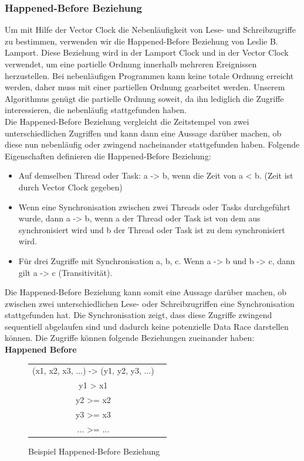 \documentclass[10pt,a4paper]{article}
\begin{document}
\subsubsection{Happened-Before Beziehung}
Um mit Hilfe der Vector Clock die Nebenläufigkeit von Lese- und Schreibzugriffe zu bestimmen, verwenden wir die Happened-Before Beziehung von Leslie B. Lamport. Diese Beziehung wird in der Lamport Clock und in der Vector Clock verwendet, um eine partielle Ordnung innerhalb mehreren Ereignissen herzustellen. Bei nebenläufigen Programmen kann keine totale Ordnung erreicht werden, daher muss mit einer partiellen Ordnung gearbeitet werden. Unserem Algorithmus genügt die partielle Ordnung soweit, da ihn lediglich die Zugriffe interessieren, die nebenläufig stattgefunden haben. \\
Die Happened-Before Beziehung vergleicht die Zeitstempel von zwei unterschiedlichen Zugriffen und kann dann eine Aussage darüber machen, ob diese nun nebenläufig oder zwingend nacheinander stattgefunden haben. Folgende Eigenschaften definieren die Happened-Before Beziehung:
\begin{itemize}
\item Auf demselben Thread oder Task: a -> b, wenn die Zeit von a < b. (Zeit ist durch Vector Clock gegeben)
\item Wenn eine Synchronisation zwischen zwei Threads oder Tasks durchgeführt wurde, dann a -> b, wenn a der Thread oder Task ist von dem aus synchronisiert wird und b der Thread oder Task ist zu dem synchronisiert wird.
\item Für drei Zugriffe mit Synchronisation a, b, c. Wenn a -> b und b -> c, dann gilt a -> c (Transitivität).
\end{itemize}
Die Happened-Before Beziehung kann somit eine Aussage darüber machen, ob zwischen zwei unterschiedlichen Lese- oder Schreibzugriffen eine Synchronisation stattgefunden hat. Die Synchronisation zeigt, dass diese Zugriffe zwingend sequentiell abgelaufen sind und dadurch keine potenzielle Data Race darstellen können. Die Zugriffe können folgende Beziehungen zueinander haben:\\[0.5cm]
\textbf{ Happened Before}\\[0.2cm]
\begin{figure}[H]
\begin{center}
\begin{tabular}{ c c }
  (x1, x2, x3, ...) -> (y1, y2, y3, ...) \\
  y1 > x1 \\
  y2 >= x2 \\
  y3 >= x3 \\
  ... >= ...
  \end{tabular}
\end{center}
\caption{Beispiel Happened-Before Beziehung}\label{example_happenedbefore}
\end{figure}
\end{document}
